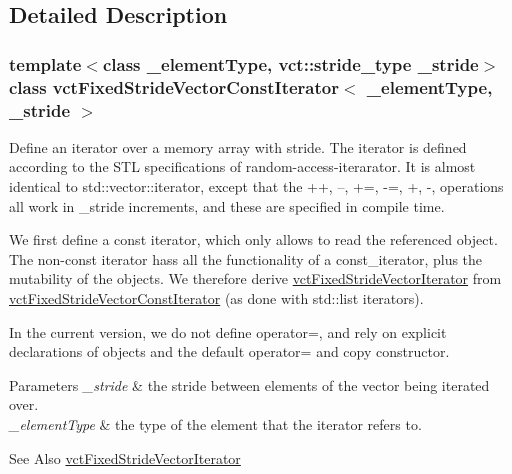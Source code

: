 \subsection{Detailed Description}
\subsubsection*{template$<$class \-\_\-element\-Type, vct\-::stride\-\_\-type \-\_\-stride$>$class vct\-Fixed\-Stride\-Vector\-Const\-Iterator$<$ \-\_\-element\-Type, \-\_\-stride $>$}

Define an iterator over a memory array with stride. The iterator is defined according to the S\-T\-L specifications of random-\/access-\/iterarator. It is almost identical to std\-::vector\-::iterator, except that the ++, --, +=, -\/=, +, -\/, operations all work in \-\_\-stride increments, and these are specified in compile time.

We first define a const iterator, which only allows to read the referenced object. The non-\/const iterator hass all the functionality of a const\-\_\-iterator, plus the mutability of the objects. We therefore derive \hyperlink{classvct_fixed_stride_vector_iterator}{vct\-Fixed\-Stride\-Vector\-Iterator} from \hyperlink{classvct_fixed_stride_vector_const_iterator}{vct\-Fixed\-Stride\-Vector\-Const\-Iterator} (as done with std\-::list iterators).

In the current version, we do not define operator=, and rely on explicit declarations of objects and the default operator= and copy constructor.


\begin{DoxyParams}{Parameters}
{\em \-\_\-stride} & the stride between elements of the vector being iterated over.\\
\hline
{\em \-\_\-element\-Type} & the type of the element that the iterator refers to.\\
\hline
\end{DoxyParams}
\begin{DoxySeeAlso}{See Also}
\hyperlink{classvct_fixed_stride_vector_iterator}{vct\-Fixed\-Stride\-Vector\-Iterator} 
\end{DoxySeeAlso}



